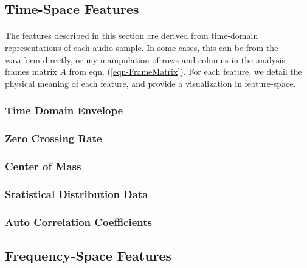 \documentclass[12pt,letterpaper]{article}
\begin{document}

\newpage

\subsection{Time-Space Features}
\label{subsec-time}

\paragraph*{}The features described in this section are derived from time-domain representations of each audio sample. In some cases, this can be from the waveform directly, or my manipulation of rows and columns in the analysis frames matrix $A$ from eqn. (\ref{eqn-FrameMatrix}). For each feature, we detail the physical meaning of each feature, and provide a visualization in feature-space.

\subsubsection{Time Domain Envelope}

\subsubsection{Zero Crossing Rate}

\subsubsection{Center of Mass}

\subsubsection{Statistical Distribution Data}

\subsubsection{Auto Correlation Coefficients}


\newpage

\subsection{Frequency-Space Features}
\label{subsec-frequency}
\end{document}
